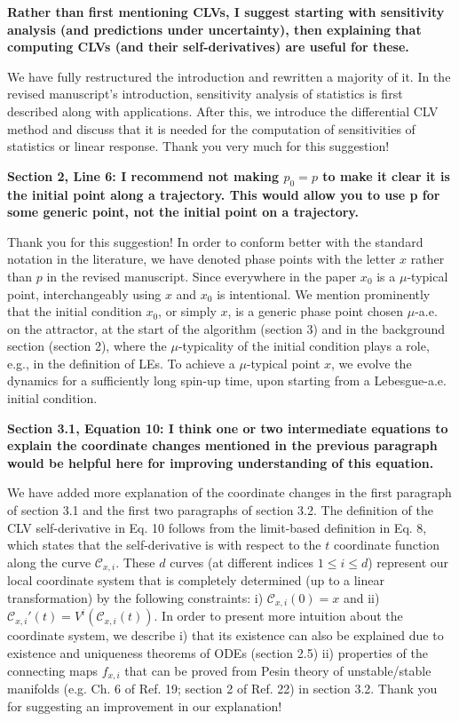 \documentclass[11pt]{article}
\newcommand{\reviewerOne}[1]{{\color{burgundy}\textbf{#1}}}
\begin{document}
\reviewerOne{Rather than first mentioning CLVs, I suggest starting with sensitivity analysis (and predictions under
uncertainty), then explaining that computing CLVs (and their self-derivatives) are useful for these.}

We have fully restructured the introduction and rewritten a majority of it. In the revised manuscript's introduction, sensitivity analysis of statistics is first described along with applications. After this, we introduce the differential CLV method and discuss that it is needed for the computation of sensitivities of statistics or linear response. Thank you very much for this suggestion!

\reviewerOne{Section 2, Line 6: I recommend not making $p_0 = p$ to make it clear it is the initial point along a trajectory. This
would allow you to use p for some generic point, not the initial point on a trajectory.}

Thank you for this suggestion!
In order to conform better with the standard notation in the literature, we have denoted phase points with the letter $x$ rather than $p$ in the revised manuscript. Since everywhere in the paper $x_0$ is a $\mu$-typical point, interchangeably using $x$ and $x_0$ is intentional. We mention prominently that the initial condition $x_0$, or simply $x$, is a generic phase point chosen $\mu$-a.e. on the attractor, at the start of the algorithm (section 3) and in the background section (section 2), where the $\mu$-typicality of the initial condition plays a role, e.g., in the definition of LEs. To achieve a $\mu$-typical point $x$, we evolve the dynamics for a sufficiently long spin-up time, upon starting from a Lebesgue-a.e. initial condition.  

\reviewerOne{Section 3.1, Equation 10: I think one or two intermediate equations to explain the coordinate changes mentioned
in the previous paragraph would be helpful here for improving understanding of this equation.}

We have added more explanation of the coordinate changes in the first paragraph of section 3.1 and the first two paragraphs of section 3.2.
The definition of the CLV self-derivative in Eq. 10 follows from the limit-based definition in Eq. 8, which states that the self-derivative is with respect to the $t$ coordinate function along the curve $\mathcal{C}_{x,i}$. These $d$ curves (at different indices $1\leq i\leq d$) represent our local coordinate system that is completely determined (up to a linear transformation) by the following constraints: i) $\mathcal{C}_{x,i}(0) = x$ and ii) $\mathcal{C}_{x,i}'(t) = V^i(\mathcal{C}_{x,i}(t)).$ In order to present more intuition about the coordinate system, we describe i) that its existence can also be explained due to existence and uniqueness theorems of ODEs (section 2.5) ii) properties of the connecting maps $f_{x,i}$ that can be proved from Pesin theory of unstable/stable manifolds (e.g. Ch. 6 of Ref. 19; section 2 of Ref. 22) in section 3.2.  
Thank you for suggesting an improvement in our explanation!
\end{document}
